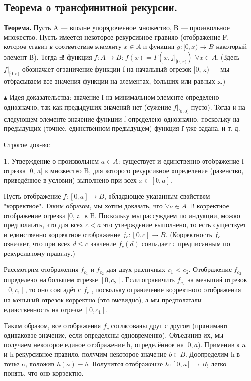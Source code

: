 \subsection{Теорема о трансфинитной рекурсии.}

\textbf{Теорема.} Пусть A — вполне упорядоченное множество, B — произвольное множество. Пусть имеется некоторое рекурсивное правило (отображение F, которое ставит в соответствие элементу $x \in A$ и функции $g : [0, x) \rightarrow B$ некоторый элемент B). Тогда $\exists !$ функция $f : A \rightarrow B$: $f(x) = F(x, f|_{[0,x)})$ $\forall x \in A$. (Здесь $f|_{[0,x)}$ обозначает ограничение функции f на начальный отрезок [0, x) — мы отбрасываем все значения функции на элементах, больших или равных x.)

$\blacktriangle$
Идея доказательства: значение f на минимальном элементе определено однозначно, так как предыдущих значений нет (сужение $f|_{[0,0)}$ пусто). Тогда и на следующем элементе значение функции f определено однозначно, поскольку на предыдущих (точнее, единственном предыдущем) функция f уже задана, и т. д.

Строгое док-во:

1. Утверждение о произвольном $a \in A$: существует и единственно отображение f отрезка [0, a] в множество B, для которого рекурсивное определение (равенство, приведённое в условии) выполнено при всех $x \in [0, a]$.

Пусть отображение $f : [0, a] \rightarrow B$, обладающее указанным свойством - "корректное". Таким образом, мы хотим доказать, что $\forall a \in A$ $\exists!$ корректное отображение отрезка [0, a] в B. Поскольку мы рассуждаем по индукции, можно предполагать, что для всех $c < a$ это утверждение выполнено, то есть существует и единственно корректное отображение $f_c : [0, c] \rightarrow B$. (Корректность $f_c$ означает, что при всех $d \leqslant c$ значение $f_c(d)$ совпадает с предписанным по рекурсивному правилу.)

Рассмотрим отображения $f_{c_1}$ и $f_{c_2}$ для двух различных $c_1$ < $c_2$. Отображение $f_{c_2}$ определено на большем отрезке $[0, c_2]$. Если ограничить $f_{c_2}$ на меньший отрезок $[0, c_1]$, то оно совпадёт с $f_{c_1}$, поскольку ограничение корректного отображения на меньший отрезок корректно (это очевидно), а мы предполагали единственность на отрезке $[0, c_1]$.

Таким образом, все отображения $f_c$ согласованы друг с другом (принимают одинаковое значение, если определены одновременно). Объединив их, мы получаем некоторое единое отображение h, определённое на $[0, a)$. Применив к a и h рекурсивное правило, получим некоторое значение $b \in B$. Доопределим h в точке a, положив $h(a) = b$. Получится отображение $h: [0, a] \rightarrow B$; легко понять, что оно корректно.

